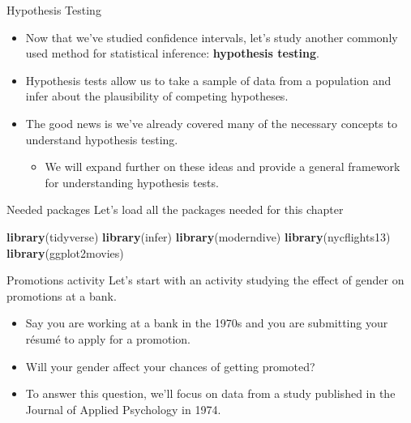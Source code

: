 \documentclass[
  ignorenonframetext,
]{beamer}
\newenvironment{Shaded}{\begin{snugshade}}{\end{snugshade}}
\newcommand{\FunctionTok}[1]{\textcolor[rgb]{0.13,0.29,0.53}{\textbf{#1}}}
\newcommand{\NormalTok}[1]{#1}
\providecommand{\tightlist}{%
  \setlength{\itemsep}{0pt}\setlength{\parskip}{0pt}}
\begin{document}
\begin{frame}{Hypothesis Testing}
\label{hypothesis-testing-1}
\begin{itemize}
\item
  Now that we've studied confidence intervals, let's study another
  commonly used method for statistical inference: \textbf{hypothesis
  testing}.
\item
  Hypothesis tests allow us to take a sample of data from a population
  and infer about the plausibility of competing hypotheses.
\item
  The good news is we've already covered many of the necessary concepts
  to understand hypothesis testing.

  \begin{itemize}
  \tightlist
  \item
    We will expand further on these ideas and provide a general
    framework for understanding hypothesis tests.
  \end{itemize}
\end{itemize}
\end{frame}

\begin{frame}[fragile]{Needed packages}
\label{needed-packages-1}
Let's load all the packages needed for this chapter

\small

\begin{Shaded}
\begin{Highlighting}[]
\FunctionTok{library}\NormalTok{(tidyverse)}
\FunctionTok{library}\NormalTok{(infer)}
\FunctionTok{library}\NormalTok{(moderndive)}
\FunctionTok{library}\NormalTok{(nycflights13)}
\FunctionTok{library}\NormalTok{(ggplot2movies)}
\end{Highlighting}
\end{Shaded}

\normalsize
\end{frame}

\begin{frame}{Promotions activity}
\label{promotions-activity}
Let's start with an activity studying the effect of gender on promotions
at a bank.

\begin{itemize}
\item
  Say you are working at a bank in the 1970s and you are submitting your
  résumé to apply for a promotion.
\item
  Will your gender affect your chances of getting promoted?
\item
  To answer this question, we'll focus on data from a study published in
  the Journal of Applied Psychology in 1974.
\end{itemize}
\end{frame}
\end{document}
